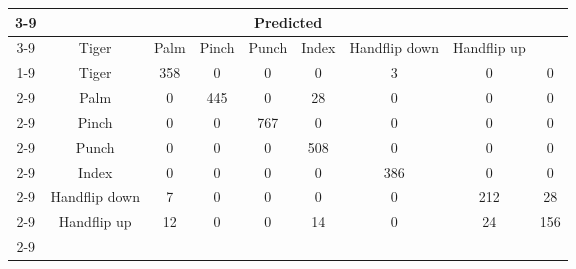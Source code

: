 \documentclass{standalone}
\begin{document}
 
 \begin{tabular}{|c |c |c |c |c |c |c |c |c |}
\cline{3-9}\multicolumn{2}{c|}{} & \multicolumn{7}{c|}{Predicted} \\ 
\cline{3-9} \multicolumn{2}{c |}{ } & Tiger & Palm & Pinch & Punch & Index & Handflip down & Handflip up\\ 
\cline{1-9}\multirow{7}{*}{\rotatebox[origin=c]{90}{Actual}} & Tiger & 358 & 0 & 0 & 0 & 3 & 0 & 0\\ 
 \cline{2-9} & Palm & 0 & 445 & 0 & 28 & 0 & 0 & 0\\ 
 \cline{2-9} & Pinch & 0 & 0 & 767 & 0 & 0 & 0 & 0\\ 
 \cline{2-9} & Punch & 0 & 0 & 0 & 508 & 0 & 0 & 0\\ 
 \cline{2-9} & Index & 0 & 0 & 0 & 0 & 386 & 0 & 0\\ 
 \cline{2-9} & Handflip down & 7 & 0 & 0 & 0 & 0 & 212 & 28\\ 
 \cline{2-9} & Handflip up & 12 & 0 & 0 & 14 & 0 & 24 & 156\\ 
 \cline{2-9}\hline \end{tabular}
 
\end{document}
